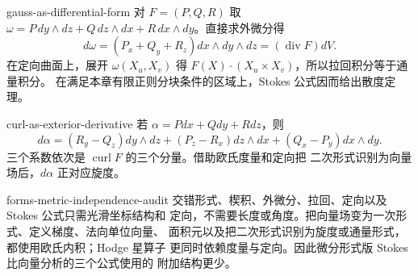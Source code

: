 \begin{solution}{gauss-as-differential-form}
对 $F=(P,Q,R)$ 取
$\omega=P\,dy\wedge dz+Q\,dz\wedge dx+R\,dx\wedge dy$。直接求外微分得
\[
 d\omega=(P_x+Q_y+R_z)dx\wedge dy\wedge dz
 =(\operatorname{div}F)dV.
\]
在定向曲面上，展开 $\omega(X_u,X_v)$ 得
$F(X)\cdot(X_u\times X_v)$，所以拉回积分等于通量积分。
在满足本章有限正则分块条件的区域上，Stokes 公式因而给出散度定理。
\end{solution}

\begin{solution}{curl-as-exterior-derivative}
若 $\alpha=Pdx+Qdy+Rdz$，则
\[
 d\alpha=(R_y-Q_z)dy\wedge dz+(P_z-R_x)dz\wedge dx
 +(Q_x-P_y)dx\wedge dy.
\]
三个系数依次是 $\operatorname{curl}F$ 的三个分量。借助欧氏度量和定向把
二次形式识别为向量场后，$d\alpha$ 正对应旋度。
\end{solution}

\begin{solution}{forms-metric-independence-audit}
交错形式、楔积、外微分、拉回、定向以及 Stokes 公式只需光滑坐标结构和
定向，不需要长度或角度。把向量场变为一次形式、定义梯度、法向单位向量、
面积元以及把二次形式识别为旋度或通量形式，都使用欧氏内积；Hodge 星算子
更同时依赖度量与定向。因此微分形式版 Stokes 比向量分析的三个公式使用的
附加结构更少。
\end{solution}
